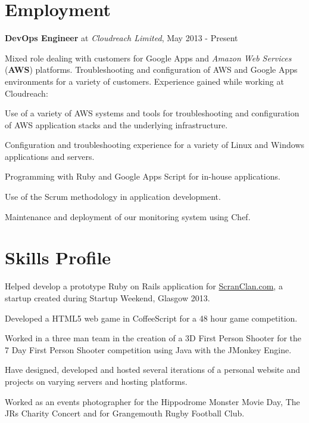 \documentclass[11pt,a4paper]{article}
\renewenvironment{itemize}{
  \begin{list}{}{
    \setlength{\leftmargin}{1em}
    \setlength{\itemsep}{0.25em}
    \setlength{\parskip}{0pt}
    \setlength{\parsep}{0.25em}
    \renewcommand{\labelitemi}{$\bullet$}
  }
}{
  \end{list}
}
\begin{document}
\section*{Employment}

\begin{itemize}
    \item \textbf{DevOps Engineer} at \emph{Cloudreach Limited}, May 2013 - Present

    Mixed role dealing with customers for Google Apps and \emph{Amazon Web Services} (\textbf{AWS}) platforms. Troubleshooting and configuration of AWS and Google Apps environments for a variety of customers.
    Experience gained while working at Cloudreach:
    \begin{itemize}
      \item Use of a variety of AWS systems and tools for troubleshooting and
        configuration of AWS application stacks and the underlying infrastructure.
      \item Configuration and troubleshooting experience for a variety of Linux and Windows
        applications and servers.
      \item Programming with Ruby and Google Apps Script for in-house applications.
      \item Use of the Scrum methodology in application development.
      \item Maintenance and deployment of our monitoring system using Chef.
    \end{itemize}
\end{itemize}

\section*{Skills Profile}

\begin{itemize}
    \item Helped develop a prototype Ruby on Rails application for \href{http://www.ScranClan.com}{ScranClan.com}, a startup created during Startup Weekend, Glasgow 2013.
    \item Developed a HTML5 web game in CoffeeScript for a 48 hour game
        competition.
    \item Worked in a three man team in the creation of a 3D First Person Shooter
        for the 7 Day First Person Shooter competition using Java with the JMonkey Engine.
    \item Have designed, developed and hosted several iterations of a personal website and projects on varying servers and hosting platforms.
    \item Worked as an events photographer for the Hippodrome Monster Movie Day, The JRs Charity Concert and for Grangemouth Rugby Football Club.
\end{itemize}
\end{document}
